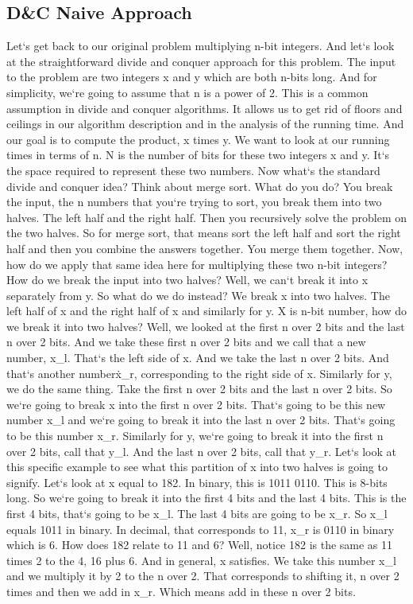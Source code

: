 \subsection{D\&C  Naive Approach}
Let`s get back to our original problem multiplying n-bit integers.
And let`s look at the straightforward divide and conquer approach for this problem.
The input to the problem are two integers x and y which are both n-bits long.
And for simplicity, we`re going to assume that n is a power of 2.
This is a common assumption in divide and conquer algorithms.
It allows us to get rid of floors and ceilings in our algorithm description and in the analysis of the running time.
And our goal is to compute the product, x times y.
We want to look at our running times in terms of n.
N is the number of bits for these two integers x and y.
It`s the space required to represent these two numbers.
Now what`s the standard divide and conquer idea? Think about merge sort.
What do you do? You break the input, the n numbers that you`re trying to sort, you break them into two halves.
The left half and the right half.
Then you recursively solve the problem on the two halves.
So for merge sort, that means sort the left half and sort the right half and then you combine the answers together.
You merge them together.
Now, how do we apply that same idea here for multiplying these two n-bit integers? How do we break the input into two halves? Well, we can`t break it into x separately from y.
So what do we do instead? We break x into two halves.
The left half of x and the right half of x and similarly for y.
X is n-bit number, how do we break it into two halves? Well, we looked at the first n over 2 bits and the last n over 2 bits.
And we take these first n over 2 bits and we call that a new number, x\_l.
That`s the left side of x.
And we take the last n over 2 bits.
And that`s another number\. x\_r, corresponding to the right side of x.
Similarly for y, we do the same thing.
Take the first n over 2 bits and the last n over 2 bits.
So we`re going to break x into the first n over 2 bits.
That`s going to be this new number x\_l and we`re going to break it into the last n over 2 bits.
That`s going to be this number x\_r.
Similarly for y, we`re going to break it into the first n over 2 bits, call that y\_l.
And the last n over 2 bits, call that y\_r.
Let`s look at this specific example to see what this partition of x into two halves is going to signify.
Let`s look at x equal to 182.
In binary, this is 1011 0110.
This is 8-bits long.
So we`re going to break it into the first 4 bits and the last 4 bits.
This is the first 4 bits, that`s going to be x\_l.
The last 4 bits are going to be x\_r.
So x\_l equals 1011 in binary.
In decimal, that corresponds to 11, x\_r is 0110 in binary which is 6.
How does 182 relate to 11 and 6? Well, notice 182 is the same as 11 times 2 to the 4, 16 plus 6.
And in general, x satisfies.
We take this number x\_l and we multiply it by 2 to the n over 2.
That corresponds to shifting it, n over 2 times and then we add in x\_r.
Which means add in these n over 2 bits.

